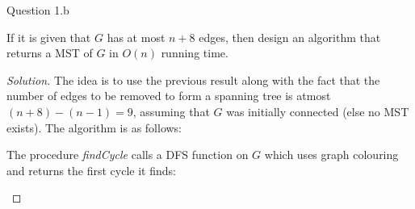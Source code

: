\begin{solution}{Question 1.b}
    \begin{question}[]
        If it is given that $G$ has at most $n+8$ edges, then design an algorithm that returns a MST of $G$ in $O(n)$ running time.
    \end{question}
    \tcblower{}
    \begin{proof}[Solution]
        The idea is to use the previous result along with the fact that the number of edges to be removed to form a spanning tree is atmost $(n+8)-(n-1)=9$, assuming that $G$ was initially connected (else no MST exists). The algorithm is as follows:
        \begin{algorithm}[H]
            \caption{Compute MST for 1.b}
            \begin{algorithmic}[1]
                            
                    \EndIf{}
                \EndProcedure{}
            \end{algorithmic}
        \end{algorithm}
        
        The procedure \textit{findCycle} calls a DFS function on $G$ which uses graph colouring and returns the first cycle it finds:
        \begin{algorithm}[H]
            \caption{$findCycle$}
            \begin{algorithmic}[1]
                    \EndWhile{}
                \EndProcedure{}
            \end{algorithmic}
        \end{algorithm}


\end{proof}
\end{solution}
